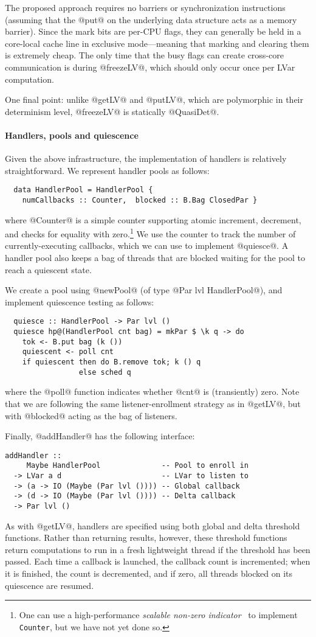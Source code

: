 The proposed approach requires no barriers or synchronization instructions
(assuming that the @put@ on the underlying data structure acts as a memory barrier).
Since the mark bits are per-CPU flags, they can generally be held in a
core-local cache line in exclusive mode---meaning that marking and clearing them
is extremely cheap.  The only time that the busy flags can create cross-core
communication is during @freezeLV@, which should only occur once per LVar
computation.

One final point: unlike @getLV@ and @putLV@, which are polymorphic in their
determinism level, @freezeLV@ is statically @QuasiDet@.

\paragraph{Handlers, pools and quiescence}

Given the above infrastructure, the implementation of handlers is relatively straightforward.
We represent handler pools as follows:
\begin{lstlisting}
  data HandlerPool = HandlerPool {
    numCallbacks :: Counter,  blocked :: B.Bag ClosedPar }
\end{lstlisting}
where @Counter@ is a simple counter supporting atomic increment, decrement, and
checks for equality with zero.\footnote{One can use a high-performance
  \emph{scalable non-zero indicator}~\cite{snzi} to implement \texttt{Counter}, but we
  have not yet done so.}  We use the counter to track the number of
currently-executing callbacks, which we can use to implement @quiesce@.  A
handler pool also keeps a bag of threads that are blocked waiting for the pool
to reach a quiescent state.

We create a pool using @newPool@ (of type @Par lvl HandlerPool@), 
and implement quiescence testing as follows:
\begin{lstlisting}
  quiesce :: HandlerPool -> Par lvl ()
  quiesce hp@(HandlerPool cnt bag) = mkPar $ \k q -> do
    tok <- B.put bag (k ())
    quiescent <- poll cnt
    if quiescent then do B.remove tok; k () q
                 else sched q
\end{lstlisting} %
where the @poll@ function indicates whether @cnt@ is (transiently) zero.  Note
that we are following the same listener-enrollment strategy as in @getLV@, but
with @blocked@ acting as the bag of listeners.

Finally, @addHandler@ has the following interface:
\begin{lstlisting}
addHandler :: 
     Maybe HandlerPool              -- Pool to enroll in
  -> LVar a d                       -- LVar to listen to
  -> (a -> IO (Maybe (Par lvl ()))) -- Global callback
  -> (d -> IO (Maybe (Par lvl ()))) -- Delta callback
  -> Par lvl ()
\end{lstlisting}
As with @getLV@, handlers are specified using both global and delta
threshold functions.  Rather than returning results, however, these threshold
functions return computations to run in a fresh lightweight thread if the
threshold has been passed.  Each time a callback is launched, the callback count
is incremented; when it is finished, the count is decremented, and if zero, all
threads blocked on its quiescence are resumed.

